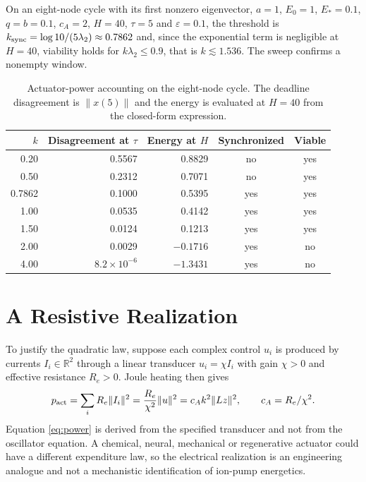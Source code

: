 \documentclass[11pt,notitlepage]{report}
\theoremstyle{definition}
\theoremstyle{remark}
\newcommand{\R}{\mathbb R}
\begin{document}
On an eight-node cycle with its first nonzero eigenvector, $a=1$, $E_0=1$, $E_*=0.1$, $q=b=0.1$, $c_A=2$, $H=40$, $\tau=5$ and $\varepsilon=0.1$, the threshold is $k_{\rm sync}=\log10/(5\lambda_2)\approx0.7862$ and, since the exponential term is negligible at $H=40$, viability holds for $k\lambda_2\le0.9$, that is $k\lesssim1.536$. The sweep confirms a nonempty window.
\begin{table}[ht]\centering\small
\caption{Actuator-power accounting on the eight-node cycle. The deadline disagreement is $\|x(5)\|$ and the energy is evaluated at $H=40$ from the closed-form expression.}
\begin{tabular}{rrrcc}\toprule
$k$&Disagreement at $\tau$&Energy at $H$&Synchronized&Viable\\\midrule
0.20&0.5567&0.8829&no&yes\\
0.50&0.2312&0.7071&no&yes\\
0.7862&0.1000&0.5395&yes&yes\\
1.00&0.0535&0.4142&yes&yes\\
1.50&0.0124&0.1213&yes&yes\\
2.00&0.0029&$-0.1716$&yes&no\\
4.00&$8.2\times10^{-6}$&$-1.3431$&yes&no\\\bottomrule
\end{tabular}
\end{table}

\section{A Resistive Realization}
To justify the quadratic law, suppose each complex control $u_i$ is produced by currents $I_i\in\R^2$ through a linear transducer $u_i=\chi I_i$ with gain $\chi>0$ and effective resistance $R_e>0$. Joule heating then gives
\begin{equation}\label{eq:power}
p_{\rm act}=\sum_iR_e\|I_i\|^2=\frac{R_e}{\chi^2}\|u\|^2=c_Ak^2\|Lz\|^2,\qquad c_A=R_e/\chi^2.
\end{equation}
Equation \eqref{eq:power} is derived from the specified transducer and not from the oscillator equation. A chemical, neural, mechanical or regenerative actuator could have a different expenditure law, so the electrical realization is an engineering analogue and not a mechanistic identification of ion-pump energetics.
\end{document}
